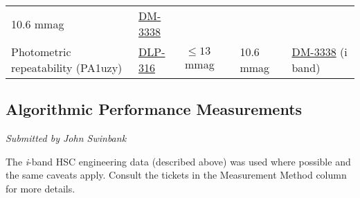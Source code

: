 \begin{longtable}[]{@{}lllll@{}}
\begin{minipage}[t]{0.11\columnwidth}
10.6 mmag\strut
\end{minipage} & \begin{minipage}[t]{0.19\columnwidth}\raggedright\strut
\href{https://jira.lsstcorp.org/browse/DM-3338}{DM-3338}\strut
\end{minipage}\tabularnewline
\begin{minipage}[t]{0.25\columnwidth}\raggedright\strut
Photometric repeatability (PA1uzy)\strut
\end{minipage} & \begin{minipage}[t]{0.11\columnwidth}\raggedright\strut
\href{https://jira.lsstcorp.org/browser/DLP-316}{DLP-316}\strut
\end{minipage} & \begin{minipage}[t]{0.20\columnwidth}\raggedright\strut
\(\leq 13\) mmag\strut
\end{minipage} & \begin{minipage}[t]{0.11\columnwidth}\raggedright\strut
10.6 mmag\strut
\end{minipage} & \begin{minipage}[t]{0.19\columnwidth}\raggedright\strut
\href{https://jira.lsstcorp.org/browse/DM-3338}{DM-3338} (i band)\strut
\end{minipage}\tabularnewline
\bottomrule
\end{longtable}

\subsection{Algorithmic Performance
Measurements}\label{algorithmic-performance-measurements}

\emph{Submitted by John Swinbank}

The \emph{i}-band HSC engineering data (described above) was used where
possible and the same caveats apply. Consult the tickets in the
Measurement Method column for more details.

